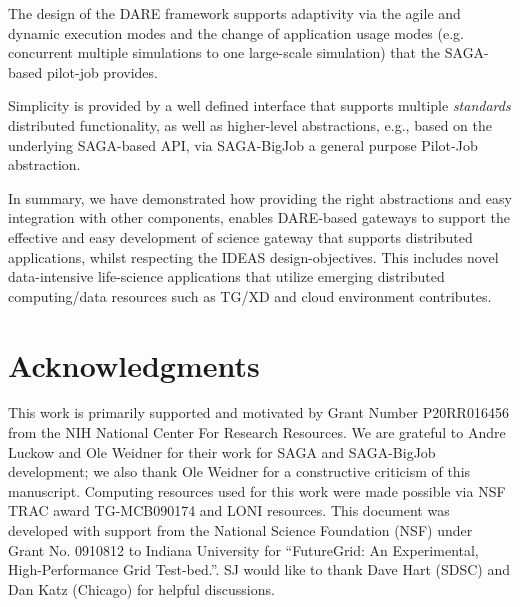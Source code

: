 \documentclass{sig-alternate}
\begin{document}
The design of the DARE framework supports adaptivity via the agile and
dynamic execution modes and the change of application usage modes
(e.g. concurrent multiple simulations to one large-scale simulation)
that the SAGA-based pilot-job provides.



Simplicity is provided by a well defined interface that supports
multiple {\it standards} distributed functionality, as well as
higher-level abstractions, e.g., based on the underlying SAGA-based
API, via SAGA-BigJob a general purpose Pilot-Job abstraction.

In summary, we have demonstrated how providing the right abstractions
and easy integration with other components, enables DARE-based
gateways to support the effective and easy development of science
gateway that supports distributed applications, whilst respecting the
IDEAS design-objectives.  This includes novel data-intensive
life-science applications that utilize emerging distributed
computing/data resources such as TG/XD and cloud environment
contributes.



\section{Acknowledgments}
This work is primarily supported and motivated by Grant Number
P20RR016456 from the NIH National Center For Research Resources.  We
are grateful to Andre Luckow and Ole Weidner for their work for SAGA
and SAGA-BigJob development; we also thank Ole Weidner for a
constructive criticism of this manuscript.  Computing resources used
for this work were made possible via NSF TRAC award TG-MCB090174 and
LONI resources.  This document was developed with support from the
National Science Foundation (NSF) under Grant No.  0910812 to Indiana
University for ``FutureGrid: An Experimental, High-Performance Grid
Test-bed.''. SJ would like to thank Dave Hart (SDSC) and Dan Katz
(Chicago) for helpful discussions.

%

%

\end{document}
